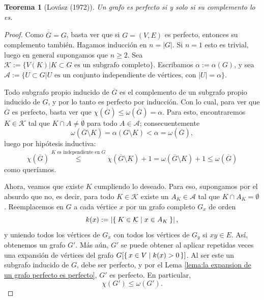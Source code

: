 \documentclass[12pt]{report}
\theoremstyle{plain}
\newtheorem{theorem}{Teorema}[section]
\theoremstyle{definition}
\newcommand{\abs}[1]{\left \vert #1 \right \vert}
\renewcommand{\bar}[1]{\overline{#1}}
\newcommand{\Kappa}{\mathcal{K}}
\begin{document}
\begin{theorem}[Lovász (1972)]
Un grafo es perfecto si y solo si su complemento lo es.
\end{theorem}
\begin{proof}
Como $\bar {\bar G} = G$, basta ver que si $G = (V,E)$ es perfecto, entonces su complemento también. Hagamos inducción en $n = \abs G$.
Si $n = 1$ esto es trivial, luego en general supongamos que $n \geq 2 $. Sea $\Kappa := \{V(K) | K \subset G \text{ es un subgrafo completo} \}$. Escribamos $\alpha := \alpha (G)$, y sea $\mathcal A := \{U \subset G | \text{$U$ es un conjunto independiente de vértices, con $\abs U = \alpha$}\}$.

Todo subgrafo propio inducido de $\bar G$ es el complemento de un subgrafo propio inducido de $G$, y por lo tanto es perfecto por inducción. Con lo cual, para ver que $\bar G$ es perfecto, basta ver que $\chi (\bar G) \leq \omega (\bar G) = \alpha$. Para esto, encontraremos $K \in \Kappa$ tal que $K \cap A \neq \emptyset$ para todo $A \in \mathcal A$; consecuentemente
\[
    \omega (\bar G \setminus K ) = \alpha (G \setminus K) < \alpha = \omega (\bar G),
\]
luego por hipótesis inductiva:
\[
    \chi (\bar G) \overset{\text{$K$ es independiente en $\bar G$}}{\leq} \chi (\bar G \setminus K )+ 1 = \omega (\bar G \setminus K) + 1 \leq \omega (\bar G)
\]
como queríamos.

Ahora, veamos que existe $K$ cumpliendo lo deseado. Para eso, supongamos por el absurdo que no, es decir, para todo $K \in \Kappa$ existe un $A_K \in \mathcal A$ tal que $K \cap A_K = \emptyset$. Reemplacemos en $G$ a cada vértice $x$ por un grafo completo $G_x$ de orden
\[
    k(x) := \abs{\Set{K \in \Kappa | x \in A_K}},
\]
y uniendo todos los vértices de $G_x$ con todos los vértices de $G_y$ si $xy \in E$. Así, obtenemos un grafo $G'$. Más aún, $G'$ se puede obtener al aplicar repetidas veces una expansión de vértices del grafo $G[\set{x \in V | k(x) > 0}]$. Al ser este un subgrafo inducido de $G$, debe ser perfecto, y por el Lema \ref{lema:la expansion de un grafo perfecto es perfecto}, $G'$ es perfecto. En particular,
\begin{equation}\label{eq:clase 21 - coloreo - Teorema 1- eq 1}
\chi (G') \leq \omega (G').
\end{equation}


\end{proof}
\end{document}

